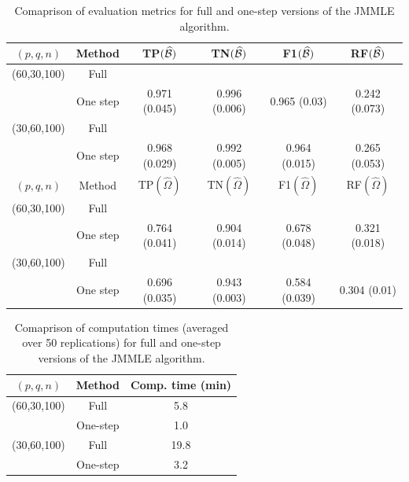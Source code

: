 \begin{table}
\centering
    \begin{tabular}{cccccc}
    \hline
    $(p,q,n)$     & Method         & TP$(\widehat {{\cal{B}}})$            & TN$(\widehat {{\cal{B}}})$            & F1$(\widehat {{\cal{B}}})$ & RF$(\widehat {{\cal{B}}})$             \\\hline
    (60,30,100) & Full         & ~ & ~ & ~   & ~                \\
    ~           & One step     & 0.971 (0.045) &  0.996 (0.006) & 0.965 (0.03)    & 0.242 (0.073) \\
    (30,60,100) & Full          & ~ & ~ & ~   & ~                \\
    ~           & One step & 0.968 (0.029) & 0.992 (0.005)  & 0.964 (0.015)   & 0.265 (0.053) \\ \hline
    \hline
    $(p,q,n)$     & Method         & TP$(\widehat \Omega)$            & TN$(\widehat \Omega)$            & F1$(\widehat \Omega)$ & RF$(\widehat \Omega)$            \\\hline
    (60,30,100) & Full         & ~ & ~ & ~   & ~                \\
    ~           & One step     & 0.764 (0.041) & 0.904 (0.014)   & 0.678 (0.048)   & 0.321 (0.018) \\
    (30,60,100) & Full          & ~ & ~ & ~   & ~                \\
    ~           & One step & 0.696 (0.035) & 0.943 (0.003)  & 0.584 (0.039)   & 0.304 (0.01) \\\hline
    \end{tabular}
    \caption{Comaprison of evaluation metrics for full and one-step versions of the JMMLE algorithm.}
    \label{table:simtable41}
\end{table}

\begin{table}[t]
\centering
  \begin{tabular}{ccc}
    \hline
    $(p,q,n)$     & Method   & Comp. time (min) \\ \hline
    (60,30,100) & Full     & 5.8              \\ 
    ~           & One-step & 1.0              \\ \hline
    (30,60,100) & Full     & 19.8             \\ 
    ~           & One-step & 3.2              \\ \hline
    \end{tabular}
    \caption{Comaprison of computation times (averaged over 50 replications) for full and one-step versions of the JMMLE algorithm.}
    \label{table:simtable42}
\end{table}



